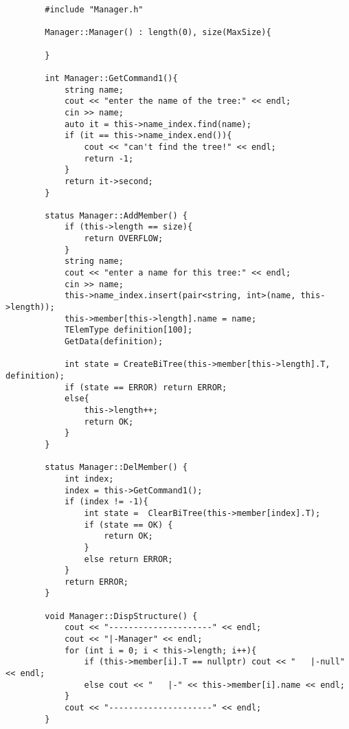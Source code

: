 \documentclass[supercite]{Experimental_Report}
\begin{document}
	\begin{lstlisting}
		#include "Manager.h"
		
		Manager::Manager() : length(0), size(MaxSize){
			
		}
		
		int Manager::GetCommand1(){
			string name;
			cout << "enter the name of the tree:" << endl;
			cin >> name;
			auto it = this->name_index.find(name);
			if (it == this->name_index.end()){
				cout << "can't find the tree!" << endl;
				return -1;
			}
			return it->second;
		}
		
		status Manager::AddMember() {
			if (this->length == size){
				return OVERFLOW;
			}
			string name;
			cout << "enter a name for this tree:" << endl;
			cin >> name;
			this->name_index.insert(pair<string, int>(name, this->length));
			this->member[this->length].name = name;
			TElemType definition[100];
			GetData(definition);
			
			int state = CreateBiTree(this->member[this->length].T, definition);
			if (state == ERROR) return ERROR;
			else{
				this->length++;
				return OK;
			}
		}
		
		status Manager::DelMember() {
			int index;
			index = this->GetCommand1();
			if (index != -1){
				int state =  ClearBiTree(this->member[index].T);
				if (state == OK) {
					return OK;
				}
				else return ERROR;
			}
			return ERROR;
		}
		
		void Manager::DispStructure() {
			cout << "---------------------" << endl;
			cout << "|-Manager" << endl;
			for (int i = 0; i < this->length; i++){
				if (this->member[i].T == nullptr) cout << "   |-null" << endl;
				else cout << "   |-" << this->member[i].name << endl;
			}
			cout << "---------------------" << endl;
		}
	\end{lstlisting}
\end{document}

